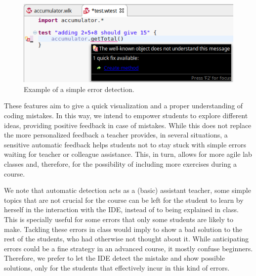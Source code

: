 \begin{figure}[ht]
 \centering
 \includegraphics[scale=0.5, trim={0 0 0.15cm 0},clip]{images/errorReporting.png}
 \caption{\small Example of a simple error detection.}
 \label{fig:errorReporting}
\end{figure}

These features aim to give a quick visualization and a proper understanding of coding mistakes. In this way, we intend to empower students to explore different ideas, providing positive feedback in case of mistakes.
While this does not replace the more personalized feedback a teacher provides, in several situations, a sensitive automatic feedback helps students not to stay stuck with simple errors waiting for teacher or colleague assistance.
This, in turn, allows for more agile lab classes and, therefore, for the possibility of including more exercises during a course.

\medskip
We note that automatic detection acts as a (basic) assistant teacher, \ie some simple topics that are not crucial for the course can be left for the student to learn by herself in the interaction with the IDE, instead of to being explained in class.
This is specially useful for some errors that only some students are likely to make.
Tackling these errors in class would imply to show a bad solution to the rest of the students, who had otherwise not thought about it. While anticipating errors could be a fine strategy in an advanced course, it mostly confuse beginners.
Therefore, we prefer to let the IDE detect the mistake and show possible solutions, only for the students that effectively incur in this kind of errors.



